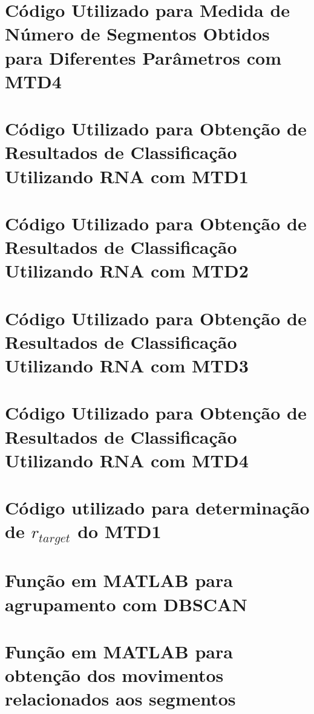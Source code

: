 \begin{apendicesenv}
\chapter{Código Utilizado para Medida de Número de Segmentos Obtidos para Diferentes Parâmetros com MTD4}
%
\label{ap:num_mtd4}
\chapter{Código Utilizado para Obtenção de Resultados de Classificação Utilizando RNA com MTD1}

\label{ap:rna_mtd1}
\chapter{Código Utilizado para Obtenção de Resultados de Classificação Utilizando RNA com MTD2}

\label{ap:rna_mtd2}
\chapter{Código Utilizado para Obtenção de Resultados de Classificação Utilizando RNA com MTD3}

\label{ap:rna_mtd3}
\chapter{Código Utilizado para Obtenção de Resultados de Classificação Utilizando RNA com MTD4}
%
\label{ap:rna_mtd4}
\chapter{Código utilizado para determinação de $r_{target}$ do MTD1}
\label{ap:r_target}

\chapter{Função em MATLAB para agrupamento com DBSCAN}
\label{ap:dbscan}

\chapter{Função em MATLAB para obtenção dos movimentos relacionados aos segmentos}
\label{ap:idMoves}

\end{apendicesenv}


